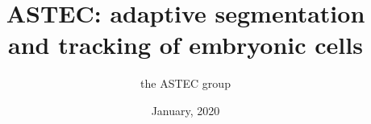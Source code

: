 \documentclass{report}
\begin{document}
\title{ASTEC: adaptive segmentation and tracking of embryonic cells}
\author{the ASTEC group}
\date{January, 2020}
\maketitle

\tableofcontents



% 









\end{document}
